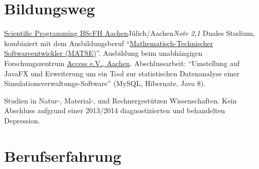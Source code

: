 \documentclass[11pt,a4paper]{moderncv}
\begin{document}
\sffamily   %
\maketitle


\section{Bildungsweg}


{\href{https://www.fh-aachen.de/en/course-of-study/angewandte-mathematik-und-informatik-bsc/}{Scientific
    Programming BSc}}{\href{https://www.fh-aachen.de/}{FH Aachen}}{Jülich/Aachen}{\textit{Note 2,1}}
{Duales Studium, kombiniert mit dem Ausbildungsberuf
  \enquote{\href{http://www.itc.rwth-aachen.de/cms/IT-Center/Lehre-Ausbildung/~letj/MATSE-Ausbildung/}{Mathematisch-Technischer
      Softwareentwickler (MATSE)}}. Ausbildung beim unabhängigen
  Forschungszentrum \href{https://access-technology.de/}{Access
    e.V., Aachen}. Abschlussarbeit: \enquote{Umstellung auf JavaFX und
    Erweiterung um ein Tool zur statistischen Datenanalyse einer
    Simulationsverwaltungs-Software} (MySQL, Hibernate, Java 8).}

{Studien in Natur-, Material-, und Rechnergestützen Wissenschaften. Kein Abschluss aufgrund einer 2013/2014 diagnostizierten und behandelten Depression.}


\section{Berufserfahrung}
\end{document}
